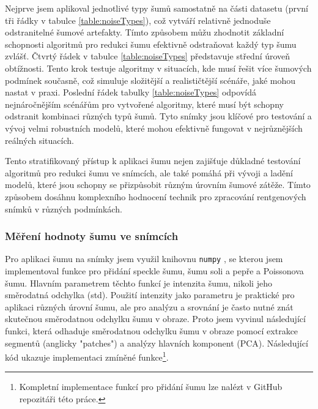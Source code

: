 \documentclass[male,czech,api_ing]{thesis}
\begin{document}
Nejprve jsem aplikoval jednotlivé typy šumů samostatně na části datasetu (první tři řádky v tabulce \ref{table:noiseTypes}), což vytváří relativně jednoduše odstranitelné šumové artefakty. Tímto způsobem můžu zhodnotit základní schopnosti algoritmů pro redukci šumu efektivně odstraňovat každý typ šumu zvlášť. Čtvrtý řádek v tabulce \ref{table:noiseTypes} představuje střední úroveň obtížnosti. Tento krok testuje algoritmy v situacích, kde musí řešit více šumových podmínek současně, což simuluje složitější a realističtější scénáře, jaké mohou nastat v praxi. Poslední řádek tabulky \ref{table:noiseTypes} odpovídá nejnáročnějším scénářům pro vytvořené algoritmy, které musí být schopny odstranit kombinaci různých typů šumů. Tyto snímky jsou klíčové pro testování a vývoj velmi robustních modelů, které mohou efektivně fungovat v nejrůznějších reálných situacích.

Tento stratifikovaný přístup k aplikaci šumu nejen zajišťuje důkladné testování algoritmů pro redukci šumu ve snímcích, ale také pomáhá při vývoji a ladění modelů, které jsou schopny se přizpůsobit různým úrovním šumové zátěže. Tímto způsobem dosáhnu komplexního hodnocení technik pro zpracování rentgenových snímků v různých podmínkách.

\subsubsection{Měření hodnoty šumu ve snímcích}
Pro aplikaci šumu na snímky jsem využil knihovnu \texttt{numpy} \cite{Numpy}, se kterou jsem implementoval funkce pro přidání speckle šumu, šumu soli a pepře a Poissonova šumu. Hlavním parametrem těchto funkcí je intenzita šumu, nikoli jeho směrodatná odchylka (std). Použití intenzity jako parametru je praktické pro aplikaci různých úrovní šumu, ale pro analýzu a srovnání je často nutné znát skutečnou směrodatnou odchylku šumu v obraze. Proto jsem vyvinul následující funkci, která odhaduje směrodatnou odchylku šumu v obraze pomocí extrakce segmentů (anglicky "patches") a analýzy hlavních komponent (PCA). Následující kód ukazuje implementaci zmíněné funkce\footnote{Kompletní implementace funkcí pro přidání šumu lze nalézt v GitHub repozitáři této práce.}.
\end{document}
